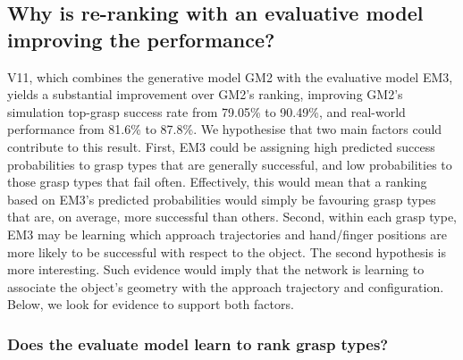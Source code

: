 \subsection{Why is re-ranking with an evaluative model improving the performance?}
\noindent

V11, which combines the generative model GM2 with the evaluative model EM3, yields a substantial improvement over GM2's ranking, improving GM2's simulation top-grasp success rate from 79.05\% to 90.49\%, and real-world performance from 81.6\% to 87.8\%. We hypothesise that two main factors could contribute to this result. First, EM3 could be assigning high predicted success probabilities to grasp types that are generally successful, and low probabilities to those grasp types that fail often. Effectively, this would mean that a ranking based on EM3's predicted probabilities would simply be favouring grasp types that are, on average, more successful than others. Second, within each grasp type, EM3 may be learning which approach trajectories and hand/finger positions are more likely to be successful with respect to the object. The second hypothesis is more interesting. Such evidence would imply that the network is learning to associate the object's geometry with the approach trajectory and configuration. Below, we look for evidence to support both factors.

\subsubsection{Does the evaluate model learn to rank grasp types?}
\noindent


